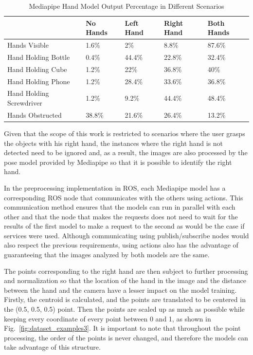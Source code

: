 \begin{table}[H]
    \centering
    \caption{Mediapipe Hand Model Output Percentage in Different Scenarios}
    \label{table:mediapipe_metrics}
    \begin{tabular}{|l|l|l|l|l|}
        \hline
        & No Hands & Left Hand & Right Hand & Both Hands \\
        \hline
        Hands Visible & 1.6\% & 2\% & 8.8\% & 87.6\% \\
        \hline
        Hand Holding Bottle & 0.4\% & 44.4\% & 22.8\% & 32.4\% \\
        \hline
        Hand Holding Cube & 1.2\% & 22\% & 36.8\% & 40\% \\
        \hline
        Hand Holding Phone & 1.2\% & 28.4\% & 33.6\% & 36.8\% \\
        \hline
        Hand Holding Screwdriver & 1.2\% & 9.2\% & 44.4\% & 48.4\% \\
        \hline
        Hands Obstructed & 38.8\% & 21.6\% & 26.4\% & 13.2\% \\
        \hline
    \end{tabular}
\end{table}

Given that the scope of this work is restricted to scenarios where the user grasps the objects with his right hand, the instances where the right hand is not detected need to be ignored and, as a result, the images are also processed by the pose model provided by Mediapipe so that it is possible to identify the right hand.

In the preprocessing implementation in ROS, each Mediapipe model has a corresponding ROS node that communicates with the others using actions. This communication method ensures that the models can run in parallel with each other and that the node that makes the requests does not need to wait for the results of the first model to make a request to the second as would be the case if services were used. Although communicating using publish/subscribe nodes would also respect the previous requirements, using actions also has the advantage of guaranteeing that the images analyzed by both models are the same.

The points corresponding to the right hand are then subject to further processing and normalization so that the location of the hand in the image and the distance between the hand and the camera have a lesser impact on the model training. Firstly, the centroid is calculated, and the points are translated to be centered in the (0.5, 0.5, 0.5) point. Then the points are scaled up as much as possible while keeping every coordinate of every point between 0 and 1, as shown in Fig.~\ref{fig:dataset_examples3}. It is important to note that throughout the point processing, the order of the points is never changed, and therefore the models can take advantage of this structure.

